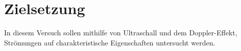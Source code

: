 \section{Zielsetzung}

\label{sec:Zielsetzung}

In diesem Versuch sollen mithilfe von Ultraschall und dem Doppler-Effekt, Strömungen auf charakteristische Eigenschaften untersucht werden. 
